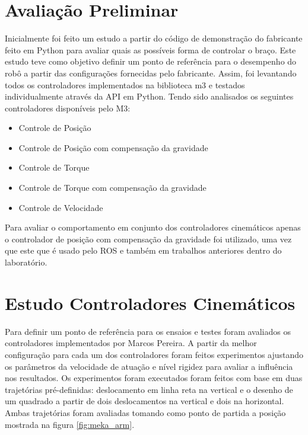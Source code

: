 

\section{Avaliação Preliminar}

Inicialmente foi feito um estudo a partir do código de demonstração do fabricante feito em Python para avaliar quais as possíveis forma de controlar o braço. Este estudo teve como objetivo definir um ponto de referência para o desempenho do robô a partir das configurações fornecidas pelo fabricante. Assim, foi levantando todos os controladores implementados na biblioteca m3 e testados individualmente através da API em Python. Tendo sido analisados os seguintes controladores disponíveis pelo M3:

\begin{itemize}
    \item Controle de Posição
    \item Controle de Posição com compensação da gravidade
    \item Controle de Torque
    \item Controle de Torque com compensação da gravidade
    \item Controle de Velocidade
\end{itemize}


Para avaliar o comportamento em conjunto dos controladores cinemáticos apenas o controlador de posição com compensação da gravidade foi utilizado, uma vez que este que é usado pelo ROS e também em trabalhos anteriores dentro do laboratório.

\section{Estudo Controladores Cinemáticos}

Para definir um ponto de referência para os ensaios e testes foram avaliados os controladores implementados por Marcos Pereira. A partir da melhor configuração para cada um dos controladores foram feitos experimentos ajustando os parâmetros da velocidade de atuação e nível rigidez para avaliar a influência nos resultados. Os experimentos foram executados foram feitos com base em duas trajetórias pré-definidas: deslocamento em linha reta na vertical e o desenho de um quadrado a partir de dois deslocamentos na vertical e dois na horizontal. Ambas trajetórias foram avaliadas tomando como ponto de partida a posição mostrada na figura \ref{fig:meka_arm}.

